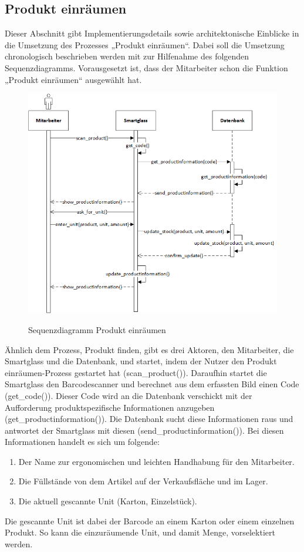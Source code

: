 \subsection{Produkt einräumen}
Dieser Abschnitt gibt Implementierungsdetails sowie architektonische Einblicke in die Umsetzung des Prozesses „Produkt einräumen“. Dabei soll die Umsetzung chronologisch beschrieben werden mit zur Hilfenahme des folgenden Sequenzdiagramms. Vorausgesetzt ist, dass der Mitarbeiter schon die Funktion „Produkt einräumen“ ausgewählt hat. 
\begin{figure}[H]
	\centering
	{\includegraphics[scale=0.7]{Bilder/Abbildungen/SMAR_produkt_einraeumen_Sequenzdiagramm.png}}
	\caption{Sequenzdiagramm Produkt einräumen}
	\label{fig:jwt_encode}
\end{figure}
Ähnlich dem Prozess, Produkt finden, gibt es drei Aktoren, den Mitarbeiter, die Smartglass und die Datenbank, und startet, indem der Nutzer den \glqq Produkt einräumen\grqq -Prozess gestartet hat (scan\_product()). Daraufhin startet die Smartglass den Barcodescanner und berechnet aus dem erfassten Bild einen Code (get\_code()). Dieser Code wird an die Datenbank verschickt mit der Aufforderung produktspezifische Informationen anzugeben (get\_productinformation()). Die Datenbank sucht diese Informationen raus und antwortet der Smartglass mit diesen (send\_productinformation()). Bei diesen Informationen handelt es sich um folgende: 
\begin{enumerate}
	\item Der Name zur ergonomischen und leichten Handhabung für den Mitarbeiter.
	\item Die Füllstände von dem Artikel auf der Verkaufsfläche und im  Lager.
	\item Die aktuell gescannte Unit (Karton, Einzelstück).
\end{enumerate}
Die gescannte Unit ist dabei der Barcode an einem Karton oder einem einzelnen Produkt. So kann die einzuräumende Unit, und damit Menge, vorselektiert werden. 

